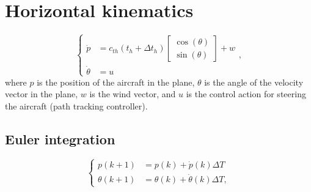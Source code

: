 \documentclass[11pt,a4paper,titlepage]{article}
\begin{document}
\section{Horizontal kinematics}
\begin{equation}
	\begin{cases}
		\dot p &= c_{th}(t_h + \Delta t_h) \begin{bmatrix}\cos(\theta) \\ \sin(\theta) \end{bmatrix} + w \\
			\dot\theta &= u
	\end{cases},
\end{equation}
where $p$ is the position of the aircraft in the plane, $\theta$ is the angle of the velocity vector in the plane, $w$ is the wind vector, and $u$ is the control action for steering the aircraft (path tracking controller).

\subsection{Euler integration}
\begin{equation}
	\begin{cases}
		p(k+1) &= p(k) + \dot p(k) \Delta T \\
		\theta(k+1) &= \theta(k) + \dot\theta(k) \Delta T,
	\end{cases}
\end{equation}
\end{document}
